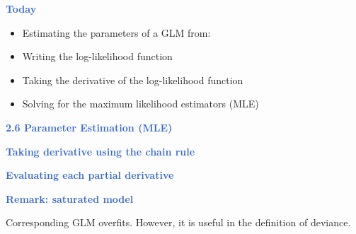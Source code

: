 \documentclass[aspectratio=169,professionalfonts,mathserif]{beamer}
\newcommand{\highlight}[1]{\textcolor{Highlight}{\bf #1}}
\renewcommand{\(}{\left(}
\renewcommand{\)}{\right)}
\renewcommand{\[}{\left[}
\renewcommand{\]}{\right]}
\newcommand{\mytitle}[1]{\vspace*{-1mm}%
  \centerline{\highlight{\Large #1}}\vspace*{3mm}}
\newenvironment{slidebox}{%
  \begin{minipage}[c][7.5cm][t]{14.4cm}\raggedright}{%
  \end{minipage}}
\begin{document}
\begin{frame}\begin{slidebox}
\mytitle{Today}

\begin{itemize}
    \item Estimating the parameters of a GLM from: 
    \pause
    \item Writing the log-likelihood function
    \pause
    \item Taking the derivative of the log-likelihood function
    \pause
    \item Solving for the maximum likelihood estimators (MLE)
\end{itemize}
\end{slidebox}\end{frame}

\begin{frame}\begin{slidebox}
\mytitle{2.6 Parameter Estimation (MLE)}
\end{slidebox}\end{frame}

\begin{frame}\begin{slidebox}
\mytitle{Taking derivative using the chain rule}
\end{slidebox}\end{frame}

\begin{frame}\begin{slidebox}
\mytitle{Evaluating each partial derivative}
\end{slidebox}\end{frame}


\begin{frame}\begin{slidebox}
\mytitle{Remark: saturated model}

Corresponding GLM overfits. However, it is useful in the definition of deviance.

\end{slidebox}\end{frame}
\end{document}
